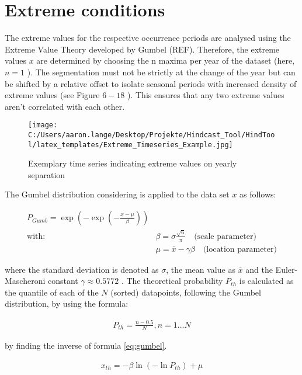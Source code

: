 
\section{Extreme conditions}

The extreme values for the respective occurrence periods are analysed using the Extreme Value Theory developed by Gumbel (REF). Therefore, the extreme values $x$ are determined by choosing the n maxima per year of the dataset (here, $n=1$ ). The segmentation must not be strictly at the change of the year but can be shifted by a relative offset to isolate seasonal periods with increased density of extreme values (see Figure $6-18$ ). This ensures that any two extreme values aren't correlated with each other.\\

\begin{figure}[H] 
 \centering 
 \texttt{[image: C:/Users/aaron.lange/Desktop/Projekte/Hindcast\_Tool/HindTool/latex\_templates/Extreme\_Timeseries\_Example.jpg]} 
 \caption{ Exemplary time series indicating extreme values on yearly separation } 
 \label{fig: Extreme_Timeseries_Example } 
\end{figure}

The Gumbel distribution considering is applied to the data set $x$ as follows:


\begin{align}
\label{eq:gumbel}
P_{G u m b}=\exp \left(-\exp \left(-\frac{x-\mu} {\beta}\right)\right) \\
\text{with: }
&\beta=\sigma \frac{\sqrt{6}}{\pi} \quad \text{(scale parameter)}\\
&\mu=\bar{x}-\gamma \beta \quad \text{(location parameter)}
\end{align}


where the standard deviation is denoted as $\sigma$, the mean value as $\bar{x}$ and the Euler-Mascheroni constant $\gamma \approx 0.5772$ . The theoretical probability $P_{t h}$ is calculated as the quantile of each of the $N$ (sorted) datapoints, following the Gumbel distribution, by using the formula:

\begin{align}
    P_{t h}=\frac{n-0.5}{N}, n=1 \ldots N
\end{align}


by finding the inverse of formula \ref{eq:gumbel}.

\begin{align}
    \label{eq:gumbel_inv}
    x_{t h}=-\beta \ln \left(-\ln P_{t h}\right)+\mu
\end{align}


